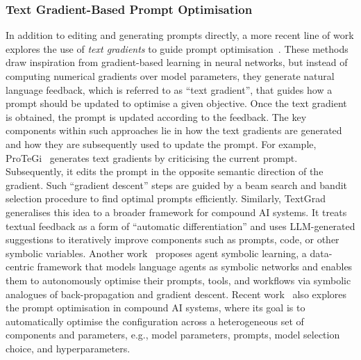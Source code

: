 \documentclass[]{selfevolagent}
\theoremstyle{plain}
\theoremstyle{definition}
\theoremstyle{remark}
\begin{document}
\subsubsection{Text Gradient-Based Prompt Optimisation} 
In addition to editing and generating prompts directly, a more recent line of work explores the use of \textit{text gradients} to guide prompt optimisation~\citep{pryzant2023automatic,yuksekgonul2024textgrad,wang2024correctly,austin2024grad,mert2025optimizing,tang2025unleashing,zhang2025revolve}. These methods draw inspiration from gradient-based learning in neural networks, but instead of computing numerical gradients over model parameters, they generate natural language feedback, which is referred to as ``text gradient'', that guides how a prompt should be updated to optimise a given objective. Once the text gradient is obtained, the prompt is updated according to the feedback. The key components within such approaches lie in how the text gradients are generated and how they are subsequently used to update the prompt. For example, ProTeGi~\citep{pryzant2023automatic} generates text gradients by criticising the current prompt. Subsequently, it edits the prompt in the opposite semantic direction of the gradient. Such ``gradient descent'' steps are guided by a beam search and bandit selection procedure to find optimal prompts efficiently. Similarly, TextGrad~\citep{yuksekgonul2024textgrad,mert2025optimizing} generalises this idea to a broader framework for compound AI systems. It treats textual feedback as a form of “automatic differentiation” and uses LLM-generated suggestions to iteratively improve components such as prompts, code, or other symbolic variables. Another work~\citep{zhou2024symbolic} proposes agent symbolic learning, a data-centric framework that models language agents as symbolic networks and enables them to autonomously optimise their prompts, tools, and workflows via symbolic analogues of back-propagation and gradient descent. Recent work~\citep{wu2025optimas} also explores the prompt optimisation in compound AI systems, where its goal is to automatically optimise the configuration across a heterogeneous set of components and parameters, e.g., model parameters, prompts, model selection choice, and hyperparameters.
\end{document}
